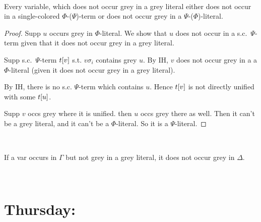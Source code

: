 \documentclass[,%
	draft=false,%
	numbers=noendperiod
	12pt,
	a4paper,
	oneside,%
	openany,
]{memoir}
\begin{document}
~

\begin{clemma}
	Every variable, which does not occur grey in a grey literal either does not occur in a single-colored $\Phi$-($\Psi$)-term or does not occur grey in a $\Psi$-($\Phi$)-literal.
\end{clemma}
\begin{proof}
	Supp $u$ occurs grey in $\Phi$-literal.
	We show that $u$ does not occur in a s.c.\ $\Psi$-term given that it does not occur grey in a grey literal.

	Supp s.c.\ $\Psi$-term $t[v]$ s.t. $v\sigma_i$ contains grey $u$.
	By IH, $v$ does not occur grey in a a $\Phi$-literal (given it does not occur grey in a grey literal). 

	By IH, there is no s.c.{} $\Psi$-term which contains $u$.
	Hence $t[v]$ is not directly unified with some $t[u]$.

	Supp $v$ occs grey where it is unified. then $u$ occs grey there as well.
	Then it can't be a grey literal, and it can't be a $\Phi$-literal. So it is a $\Psi$-literal.

\end{proof}

~

\begin{clemma}
	If a var occurs in $\Gamma$ but not grey in a grey literal, it does not occur grey in $\Delta$.
\end{clemma}

~

\clearpage

\section{Thursday:}
\end{document}

